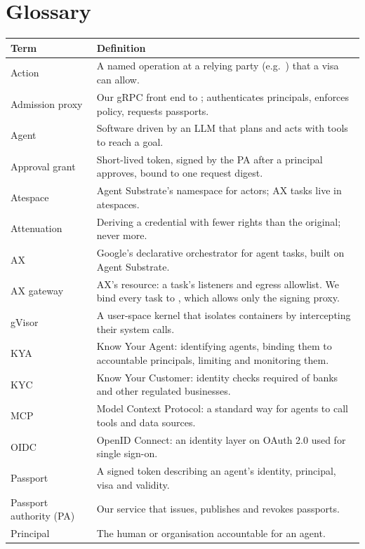 \section{Glossary}

\begin{center}
\small
\begin{longtable}{@{}L{3.8cm}L{12.3cm}@{}}
\toprule
\textbf{Term} & \textbf{Definition}\\
\midrule
\endhead
Action & A named operation at a relying party (e.g.\ ) that a visa can allow.\\
Admission proxy & Our gRPC front end to ; authenticates principals, enforces policy, requests passports.\\
Agent & Software driven by an LLM that plans and acts with tools to reach a goal.\\
Approval grant & Short-lived token, signed by the PA after a principal approves, bound to one request digest.\\
Atespace & Agent Substrate's namespace for actors; AX tasks live in atespaces.\\
Attenuation & Deriving a credential with fewer rights than the original; never more.\\
AX & Google's declarative orchestrator for agent tasks, built on Agent Substrate.\\
AX gateway & AX's  resource: a task's listeners and egress allowlist. We bind every task to , which allows only the signing proxy.\\
gVisor & A user-space kernel that isolates containers by intercepting their system calls.\\
KYA & Know Your Agent: identifying agents, binding them to accountable principals, limiting and monitoring them.\\
KYC & Know Your Customer: identity checks required of banks and other regulated businesses.\\
MCP & Model Context Protocol: a standard way for agents to call tools and data sources.\\
OIDC & OpenID Connect: an identity layer on OAuth 2.0 used for single sign-on.\\
Passport & A signed token describing an agent's identity, principal, visa and validity.\\
Passport authority (PA) & Our service that issues, publishes and revokes passports.\\
Principal & The human or organisation accountable for an agent.\\

\end{longtable}
\end{center}
